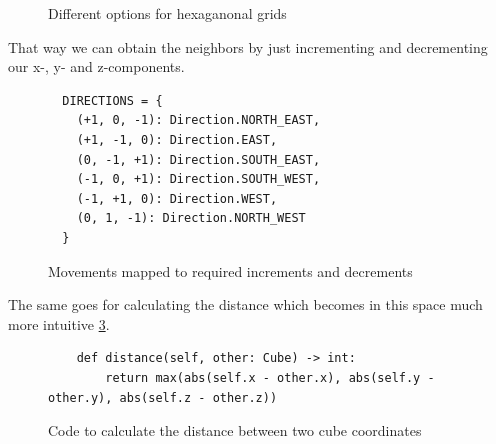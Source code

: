 \documentclass{llncs}
\begin{document}
\begin{figure}[!h]
  \centering
  \hfill
  \caption{Different options for hexaganonal grids \cite{noauthor_red_nodate}}
  \label{hex_grids}
\end{figure}

That way we can obtain the neighbors by just incrementing and decrementing our x-, y- and z-components.

\begin{figure}
  \begin{lstlisting}
  DIRECTIONS = {
    (+1, 0, -1): Direction.NORTH_EAST,
    (+1, -1, 0): Direction.EAST,
    (0, -1, +1): Direction.SOUTH_EAST,
    (-1, 0, +1): Direction.SOUTH_WEST,
    (-1, +1, 0): Direction.WEST,
    (0, 1, -1): Direction.NORTH_WEST
  }
\end{lstlisting}
  \label{directions}
  \caption{Movements mapped to required increments and decrements}
\end{figure}

The same goes for calculating the distance which becomes in this space much more intuitive \ref{distance}.

\begin{figure}
  \begin{lstlisting}
    def distance(self, other: Cube) -> int:
        return max(abs(self.x - other.x), abs(self.y - other.y), abs(self.z - other.z))
\end{lstlisting}
  \label{distance}
  \caption{Code to calculate the distance between two cube coordinates \cite{noauthor_ture_nodate}}
\end{figure}
\end{document}
